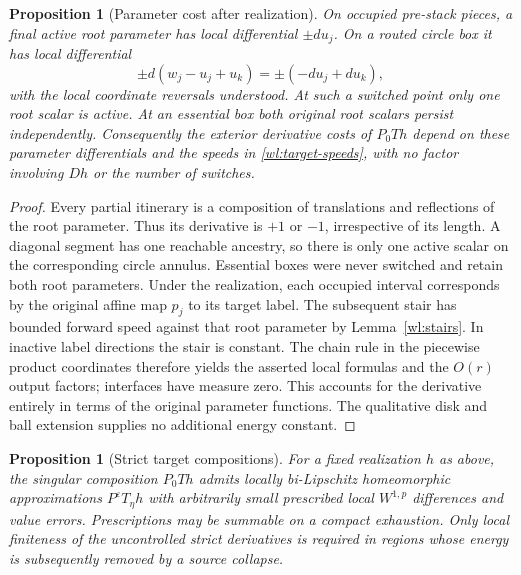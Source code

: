 \documentclass[11pt]{article}
\numberwithin{equation}{section}
\newtheorem{proposition}[theorem]{Proposition}
\theoremstyle{definition}
\theoremstyle{remark}
\begin{document}
\begin{proposition}[Parameter cost after realization]\label{wl:parameter-cost}
On occupied pre-stack pieces, a final active root parameter has
local differential $\pm du_j$.  On a routed circle box it has local
differential
\begin{equation}\label{wl:diagonal-gradient}
 \pm d(w_j-u_j+u_k)=\pm(-du_j+du_k),
\end{equation}
with the local coordinate reversals understood.  At such a switched
point only one root scalar is active.  At an essential box both
original root scalars persist independently.  Consequently the
exterior derivative costs of $P_0Th$ depend on these parameter
differentials and the speeds in \eqref{wl:target-speeds}, with no
factor involving $Dh$ or the number of switches.
\end{proposition}

\begin{proof}
Every partial itinerary is a composition of translations and
reflections of the root parameter.  Thus its derivative is $+1$
or $-1$, irrespective of its length.  A diagonal segment has one
reachable ancestry, so there is only one active scalar on the
corresponding circle annulus.  Essential boxes were never switched
and retain both root parameters.  Under the realization, each
occupied interval corresponds by the original affine map $p_j$ to
its target label.  The subsequent stair has bounded forward speed
against that root parameter by Lemma~\ref{wl:stairs}.  In inactive
label directions the stair is constant.  The chain rule in the
piecewise product coordinates therefore yields the asserted local
formulas and the $O(r)$ output factors; interfaces have measure
zero.  This accounts for the derivative entirely in terms of the
original parameter functions.  The qualitative disk and ball
extension supplies no additional energy constant.
\end{proof}

\begin{proposition}[Strict target compositions]\label{wl:strict}
For a fixed realization $h$ as above, the singular composition $P_0Th$
admits locally bi-Lipschitz homeomorphic approximations
$P^{\varepsilon}T_\eta h$ with arbitrarily small prescribed local
$W^{1,p}$ differences and value errors.  Prescriptions may be
summable on a compact exhaustion.  Only local finiteness of the
uncontrolled strict derivatives is required in regions whose energy
is subsequently removed by a source collapse.
\end{proposition}
\end{document}
